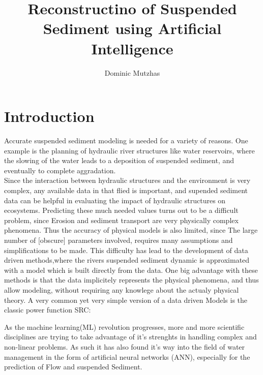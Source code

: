 \documentclass[twocolumn]{article}
\begin{document}
\title{Reconstructino of Suspended Sediment using Artificial Intelligence}
\author{Dominic Mutzhas}
\maketitle

\begin{abstract} 

\end{abstract} 


\section{Introduction}
Accurate suspended sediment modeling is needed for a variety of reasons. One example is the planning of hydraulic river structures like water reservoirs, where the slowing of the water leads to a deposition of suspended sediment, and eventually to complete aggradation. \\
Since the interaction between hydraulic structures and the environment is very complex, any available data in that flied is important, and supended sediment data can be helpful in evaluating the impact of hydraulic structures on ecosystems.
Predicting these much needed values turns out to be a difficult problem, since Erosion and sediment transport are very physically complex phenomena. Thus the accuracy of physical models is also limited, since The large number of [obscure] parameters involved, requires many assumptions and simplifications to be made.
This difficulty has lead to the development of data driven methods,where the rivers suspended sediment dynamic is approximated with a model which is built directly from the data. One big advantage with these methods is that the data implicitely represents the physical phenomena, and thus allow modeling, without requiring any knowlege about the actualy physical theory. 
A very common yet very simple version of a data driven Models is the classic power function SRC: 
 


As the machine learning(ML) revolution progresses, more and more scientific disciplines are trying to take advantage of it's strenghts in handling complex and non-linear problems. As such it has also found it's way into the field of water management in the form of artificial neural networks (ANN), especially for the prediction of Flow and suspended Sediment.
\end{document}
